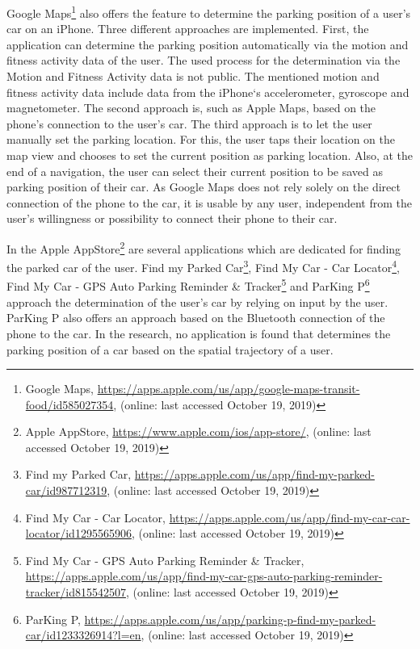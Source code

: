 Google Maps\footnote{Google Maps, \url{https://apps.apple.com/us/app/google-maps-transit-food/id585027354}, (online: last accessed October 19, 2019)} also offers the feature to determine the parking position of a user's car on an iPhone. Three different approaches are implemented. First,  the application can determine the parking position automatically via the motion and fitness activity data of the user. The used process for the determination via the Motion and Fitness Activity data is not public. The mentioned motion and fitness activity data include data from the iPhone`s accelerometer, gyroscope and magnetometer. The second approach is, such as Apple Maps, based on the phone's connection to the user's car. The third approach is to let the user manually set the parking location. For this, the user taps their location on the map view and chooses to set the current position as parking location. Also, at the end of a navigation, the user can select their current position to be saved as parking position of their car. As Google Maps does not rely solely on the direct connection of the phone to the car, it is usable by any user, independent from the user's willingness or possibility to connect their phone to their car. \cite{google:maps:app:parkedcar}  \cite{apple:CoreMotion}

In the Apple AppStore\footnote{Apple AppStore, \url{https://www.apple.com/ios/app-store/}, (online: last accessed October 19, 2019)} are several applications which are dedicated for finding the parked car of the user. Find my Parked Car\footnote{Find my Parked Car, \url{https://apps.apple.com/us/app/find-my-parked-car/id987712319}, (online: last accessed October 19, 2019)}, Find My Car - Car Locator\footnote{Find My Car - Car Locator, \url{https://apps.apple.com/us/app/find-my-car-car-locator/id1295565906}, (online: last accessed October 19, 2019)}, Find My Car - GPS Auto Parking Reminder \& Tracker\footnote{Find My Car - GPS Auto Parking Reminder \& Tracker, \url{https://apps.apple.com/us/app/find-my-car-gps-auto-parking-reminder-tracker/id815542507}, (online: last accessed October 19, 2019)} and ParKing P\footnote{ParKing P, \url{https://apps.apple.com/us/app/parking-p-find-my-parked-car/id1233326914?l=en}, (online: last accessed October 19, 2019)} approach the determination of the user's car by relying on input by the user. ParKing P also offers an approach based on the Bluetooth connection of the phone to the car. In the research, no application is found that determines the parking position of a car based on the spatial trajectory of a user.

